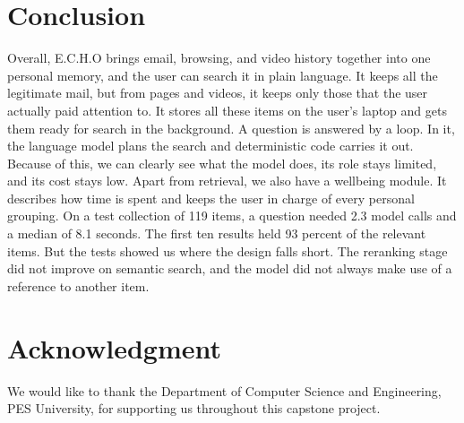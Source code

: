 \documentclass[conference]{IEEEtran}
\begin{document}
\section{Conclusion}\label{sec:conc}
Overall, E.C.H.O brings email, browsing, and video history together into one personal memory, and the user can search it in plain language. It keeps all the legitimate mail, but from pages and videos, it keeps only those that the user actually paid attention to. It stores all these items on the user's laptop and gets them ready for search in the background. A question is answered by a loop. In it, the language model plans the search and deterministic code carries it out. Because of this, we can clearly see what the model does, its role stays limited, and its cost stays low. Apart from retrieval, we also have a wellbeing module. It describes how time is spent and keeps the user in charge of every personal grouping. On a test collection of 119 items, a question needed 2.3 model calls and a median of 8.1 seconds. The first ten results held 93 percent of the relevant items. But the tests showed us where the design falls short. The reranking stage did not improve on semantic search, and the model did not always make use of a reference to another item.

\section*{Acknowledgment}
We would like to thank the Department of Computer Science and Engineering, PES University, for supporting us throughout this capstone project.
\end{document}
